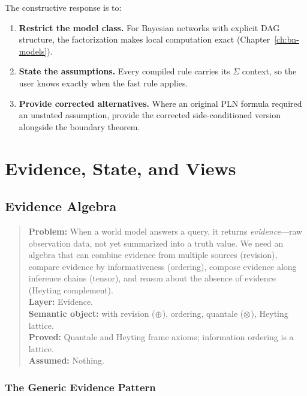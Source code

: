\documentclass[11pt,openany]{report}
\begin{document}
The constructive response is to:
\begin{enumerate}
\item \textbf{Restrict the model class.}  For Bayesian networks with
  explicit DAG structure, the factorization makes local computation
  exact (Chapter~\ref{ch:bn-models}).
\item \textbf{State the assumptions.}  Every compiled rule carries its
  $\Sigma$ context, so the user knows exactly when the fast rule applies.
\item \textbf{Provide corrected alternatives.}  Where an original PLN
  formula required an unstated assumption, provide the corrected
  side-conditioned version alongside the boundary theorem.
\end{enumerate}


\part{Evidence, State, and Views}
\label{part:evidence}

\chapter{Evidence Algebra}
\label{ch:evidence}

\begin{quote}\small
\textbf{Problem:} When a world model answers a query, it returns
\emph{evidence}---raw observation data, not yet summarized into a truth
value.  We need an algebra that can combine evidence from multiple
sources (revision), compare evidence by informativeness (ordering),
compose evidence along inference chains (tensor), and reason about the
absence of evidence (Heyting complement).\\[4pt]
\textbf{Layer:} Evidence.\\
\textbf{Semantic object:} \Evidence{} with revision ($\oplus$), ordering, quantale ($\otimes$), Heyting lattice.\\
\textbf{Proved:} Quantale and Heyting frame axioms; information ordering is a lattice.\\
\textbf{Assumed:} Nothing.
\end{quote}

\section{The Generic Evidence Pattern}
\end{document}
